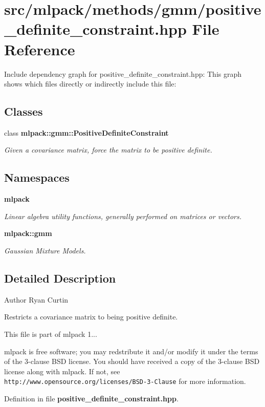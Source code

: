 \section{src/mlpack/methods/gmm/positive\-\_\-definite\-\_\-constraint.hpp File Reference}
\label{positive__definite__constraint_8hpp}
Include dependency graph for positive\-\_\-definite\-\_\-constraint.\-hpp\-:
This graph shows which files directly or indirectly include this file\-:
\subsection*{Classes}
\begin{DoxyCompactItemize}
\item 
class {\bf mlpack\-::gmm\-::\-Positive\-Definite\-Constraint}
\begin{DoxyCompactList}\small\item\em Given a covariance matrix, force the matrix to be positive definite. \end{DoxyCompactList}\end{DoxyCompactItemize}
\subsection*{Namespaces}
\begin{DoxyCompactItemize}
\item 
{\bf mlpack}
\begin{DoxyCompactList}\small\item\em Linear algebra utility functions, generally performed on matrices or vectors. \end{DoxyCompactList}\item 
{\bf mlpack\-::gmm}
\begin{DoxyCompactList}\small\item\em Gaussian Mixture Models. \end{DoxyCompactList}\end{DoxyCompactItemize}


\subsection{Detailed Description}
\begin{DoxyAuthor}{Author}
Ryan Curtin
\end{DoxyAuthor}
Restricts a covariance matrix to being positive definite.

This file is part of mlpack 1...

mlpack is free software; you may redstribute it and/or modify it under the terms of the 3-\/clause B\-S\-D license. You should have received a copy of the 3-\/clause B\-S\-D license along with mlpack. If not, see {\tt http\-://www.\-opensource.\-org/licenses/\-B\-S\-D-\/3-\/\-Clause} for more information. 

Definition in file {\bf positive\-\_\-definite\-\_\-constraint.\-hpp}.

